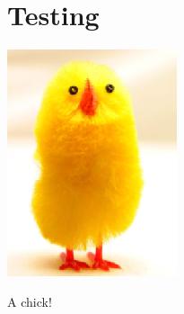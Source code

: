 \chapter{Testing}

\begin{table}
\includegraphics{chick}
\caption{A chick!}
\end{table}


\texttt{\meaning\captionsspanish}

\makeatletter
\texttt{\meaning\@nameuse}
\makeatother
